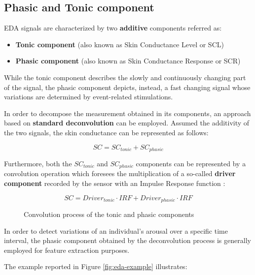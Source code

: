 \subsection{Phasic and Tonic component}\label{subsec:phasic-tonic}

EDA signals are characterized by two \textbf{additive} components \cite{eda-guide} referred as:

\begin{itemize}
    \item \textbf{Tonic component} (also known as Skin Conductance Level or SCL)
    \item \textbf{Phasic component} (also known as Skin Conductance Response or SCR)
\end{itemize}

While the tonic component describes the slowly and continuously changing part of the signal, the phasic component depicts, instead, a fast changing signal whose variations are determined by event-related stimulations.

In order to decompose the measurement obtained in its components, an approach based on \textbf{standard deconvolution} can be employed. Assumed the additivity of the two signals, the skin conductance can be represented as follows:

\begin{equation}
    SC = SC_{tonic} + SC_{phasic}
\end{equation}

Furthermore, both the $SC_{tonic}$ and $SC_{phasic}$ components can be represented by a convolution operation which foresees the multiplication of a so-called \textbf{driver component} recorded by the sensor with an Impulse Response function \cite{edasvm}:

\vspace{5mm}

\begin{figure}[h]
\begin{equation}
SC = Driver_{tonic} \cdot IRF + Driver_{phasic} \cdot IRF
\end{equation}
\caption{Convolution process of the tonic and phasic components}
\label{fig:eda-convolution}
\end{figure}

In order to detect variations of an individual's arousal over a specific time interval, the phasic component obtained by the deconvolution process is generally employed for feature extraction purposes.

The example reported in Figure \ref{fig:eda-example} illustrates:

